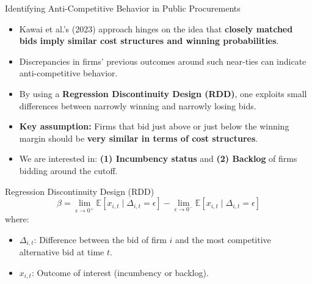 \documentclass[12pt,english,xcolor=dvipsnames,aspectratio=1610]{beamer}
\begin{document}
\begin{frame}{Identifying Anti-Competitive Behavior in Public Procurements}
\begin{itemize}
  \item Kawai et al.'s (2023) approach hinges on the idea that \textbf{closely matched bids imply similar cost structures and winning probabilities}. \vspace{2mm}
  \item Discrepancies in firms' previous outcomes around such near-ties can indicate anti-competitive behavior. \pause \vspace{2mm}
  \item By using a \textbf{Regression Discontinuity Design (RDD)}, one exploits small differences between narrowly winning and narrowly losing bids. \vspace{2mm}
  \item \textbf{Key assumption:} Firms that bid just above or just below the winning margin should be \textbf{very similar in terms of cost structures}. \pause \vspace{2mm}
  \item We are interested in: \textbf{(1) Incumbency status} and \textbf{(2) Backlog} of firms bidding around the cutoff.
\end{itemize}
\end{frame}

\begin{frame}{Regression Discontinuity Design (RDD)}
\[
\beta = \lim_{\epsilon \to 0^+} \mathbb{E}\!\left[x_{i,t} \mid \Delta_{i,t} = \epsilon\right]
   - \lim_{\epsilon \to 0^-} \mathbb{E}\!\left[x_{i,t} \mid \Delta_{i,t} = \epsilon\right]
\]
where:
\begin{itemize}
  \item \( \Delta_{i,t} \): Difference between the bid of firm \( i \) and the most competitive alternative bid at time \( t \).
  \item \( x_{i,t} \): Outcome of interest (incumbency or backlog).
\end{itemize}
\end{frame}
\end{document}
